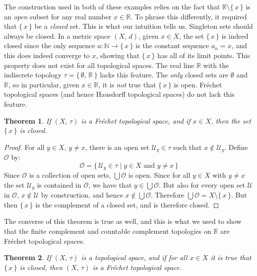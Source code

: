 \documentclass{article}
\theoremstyle{plain}
\newtheorem{theorem}{Theorem}[section]
\theoremstyle{normal}
\begin{document}
    The construction used in both of these examples relies on the fact that
    $\mathbb{R}\setminus\{\,x\,\}$ is an \textit{open} subset for any real
    number $x\in\mathbb{R}$. To phrase this differently, it required that
    $\{\,x\,\}$ be a \textit{closed} set. This is what our intuition tells us.
    Singleton sets should always be closed. In a metric space $(X,\,d)$, given
    $x\in{X}$, the set $\{\,x\,\}$ is indeed closed since the only sequence
    $a:\mathbb{N}\rightarrow\{\,x\,\}$ is the constant sequence
    $a_{n}=x$, and this does indeed converge to $x$, showing that
    $\{\,x\,\}$ has all of its limit points. This property does not exist for
    all topological spaces. The real line $\mathbb{R}$ with the indiscrete
    topology $\tau=\{\,\emptyset,\,\mathbb{R}\,\}$ lacks this feature. The
    \textit{only} closed sets are $\emptyset$ and $\mathbb{R}$, so in
    particular, given $x\in\mathbb{R}$, it is \textit{not} true that
    $\{\,x\,\}$ is open. Fr\'{e}chet topological spaces (and hence Hausdorff
    topological spaces) do not lack this feature.
    \begin{theorem}
        If $(X,\,\tau)$ is a Fr\'{e}chet topological space, and if $x\in{X}$,
        then the set $\{\,x\,\}$ is closed.
    \end{theorem}
    \begin{proof}
        For all $y\in{X}$, $y\ne{x}$, there is an open set
        $\mathcal{U}_{y}\in\tau$ such that $x\notin\mathcal{U}_{y}$. Define
        $\mathcal{O}$ by:
        \begin{equation}
            \mathcal{O}=\{\,\mathcal{U}_{y}\in\tau\;|\;
                y\in{X}\textrm{ and }y\ne{x}\,\}
        \end{equation}
        Since $\mathcal{O}$ is a collection of open sets,
        $\bigcup\mathcal{O}$ is open. Since for all $y\in{X}$ with
        $y\ne{x}$ the set $\mathcal{U}_{y}$ is contained in $\mathcal{O}$,
        we have that $y\in\bigcup\mathcal{O}$. But also for every open set
        $\mathcal{U}$ in $\mathcal{O}$, $x\notin\mathcal{U}$ by construction,
        and hence $x\notin\bigcup\mathcal{O}$. Therefore
        $\bigcup\mathcal{O}=X\setminus\{\,x\,\}$. But then
        $\{\,x\,\}$ is the complement of a closed set, and is therefore closed.
    \end{proof}
    The converse of this theorem is true as well, and this is what we used to
    show that the finite complement and countable complement topologies on
    $\mathbb{R}$ are Fr\'{e}chet topological spaces.
    \begin{theorem}
        If $(X,\,\tau)$ is a topological space, and if for all $x\in{X}$ it is
        true that $\{\,x\,\}$ is closed, then $(X,\,\tau)$ is a
        Fr\'{e}chet topological space.
    \end{theorem}
\end{document}
